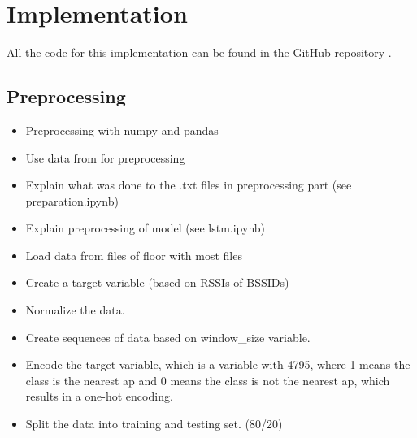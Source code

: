 \chapter{Implementation}\label{ch:implementation}

All the code for this implementation can be found in the GitHub repository \cite{github-repo}.

\section{Preprocessing}
\begin{itemize}
    \item Preprocessing with numpy and pandas
    \item Use data from  for preprocessing
    \item Explain what was done to the .txt files in preprocessing part  (see \cite{github-repo} preparation.ipynb)
    \item Explain preprocessing of model (see \cite{github-repo} lstm.ipynb)
    \item Load data from files of floor with most files
    \item Create a target variable (based on RSSIs of BSSIDs)
    \item Normalize the data.
    \item Create sequences of data based on window\_size variable.
    \item Encode the target variable, which is a variable with 4795, where 1 means the class is the nearest \ac{ap} and 0 means the class is not the nearest \ac{ap}, which results in a one-hot encoding.
    \item Split the data into training and testing set. (80/20)
\end{itemize}

%     

